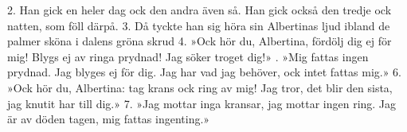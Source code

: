 \setlength{\columnsep}{0.5cm}
\begin{multicols}{2}
2.  Han gick en heler dag
    ock den andra även så.
    Han gick också den tredje
    ock natten, som föll därpå.
3.  Då tyckte han sig höra
    sin Albertinas ljud
    ibland de palmer sköna
    i dalens gröna skrud
4.  »Ock hör du, Albertina,
    fördölj dig ej för mig!
    Blygs ej av ringa prydnad!
    Jag söker troget dig!»
\vfill{}.  »Mig fattas ingen prydnad.
    Jag blyges ej för dig.
    Jag har vad jag behöver,
    ock intet fattas mig.»
6.  »Ock hör du, Albertina:
    tag krans ock ring av mig!
    Jag tror, det blir den sista,
    jag knutit har till dig.»
7.  »Jag mottar inga kransar,
    jag mottar ingen ring.
    Jag är av döden tagen,
    mig fattas ingenting.»
\end{multicols}
